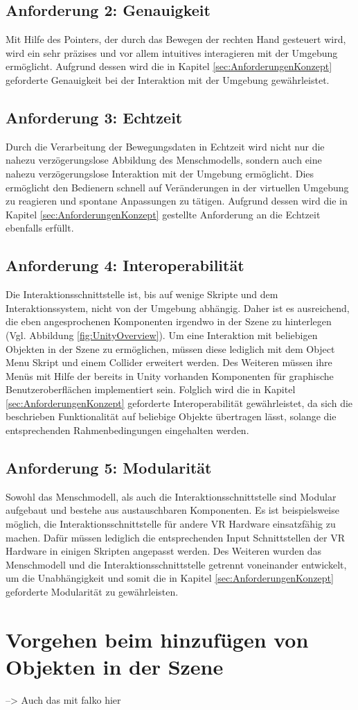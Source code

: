 \subsection{Anforderung 2: Genauigkeit}
Mit Hilfe des Pointers, der durch das Bewegen der rechten Hand gesteuert wird, wird ein sehr präzises und vor allem intuitives interagieren mit der Umgebung ermöglicht. Aufgrund dessen wird die in Kapitel \ref{sec:AnforderungenKonzept} geforderte Genauigkeit bei der Interaktion mit der Umgebung gewährleistet.

\subsection{Anforderung 3: Echtzeit}
Durch die Verarbeitung der Bewegungsdaten in Echtzeit wird nicht nur die nahezu verzögerungslose Abbildung des Menschmodells, sondern auch eine nahezu verzögerungslose Interaktion mit der Umgebung ermöglicht. Dies ermöglicht den Bedienern schnell auf Veränderungen in der virtuellen Umgebung zu reagieren und spontane Anpassungen zu tätigen. Aufgrund dessen wird die in Kapitel \ref{sec:AnforderungenKonzept} gestellte Anforderung an die Echtzeit ebenfalls erfüllt.

\subsection{Anforderung 4: Interoperabilität}
Die Interaktionsschnittstelle ist, bis auf wenige Skripte und dem Interaktionssystem, nicht von der Umgebung abhängig. Daher ist es ausreichend, die eben angesprochenen Komponenten irgendwo in der Szene zu hinterlegen (Vgl. Abbildung \ref{fig:UnityOverview}). Um eine Interaktion mit beliebigen Objekten in der Szene zu ermöglichen, müssen diese lediglich mit dem Object Menu Skript und einem Collider erweitert werden. Des Weiteren müssen ihre Menüs mit Hilfe der bereits in Unity vorhanden Komponenten für graphische Benutzeroberflächen implementiert sein. Folglich wird die in Kapitel \ref{sec:AnforderungenKonzept} geforderte Interoperabilität gewährleistet, da sich die beschrieben Funktionalität auf beliebige Objekte übertragen lässt, solange die entsprechenden Rahmenbedingungen eingehalten werden.

\subsection{Anforderung 5: Modularität}
Sowohl das Menschmodell, als auch die Interaktionsschnittstelle sind Modular aufgebaut und bestehe aus austauschbaren Komponenten. Es ist beispielsweise möglich, die Interaktionsschnittstelle für andere VR Hardware einsatzfähig zu machen. Dafür müssen lediglich die entsprechenden Input Schnittstellen der VR Hardware in einigen Skripten angepasst werden. Des Weiteren wurden das Menschmodell und die Interaktionsschnittstelle getrennt voneinander entwickelt, um die Unabhängigkeit und somit die in Kapitel \ref{sec:AnforderungenKonzept} geforderte Modularität zu gewährleisten.

\section{Vorgehen beim hinzufügen von Objekten in der Szene}\label{sec:ValidVorgehen}
--> Auch das mit falko hier